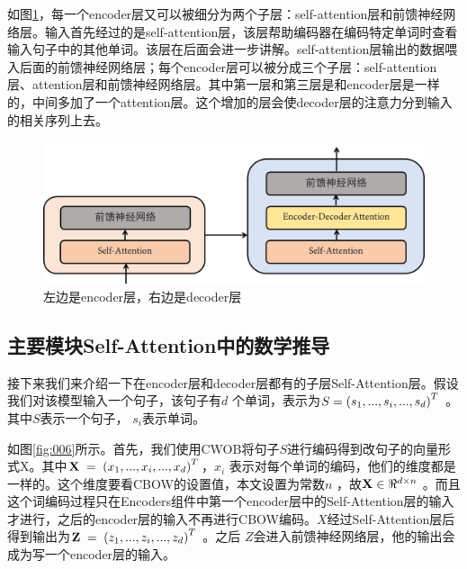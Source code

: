 \documentclass[]{article}
\begin{document}
如图\ref{fig:005}，每一个encoder层又可以被细分为两个子层：self-attention层和前馈神经网络层。输入首先经过的是self-attention层，该层帮助编码器在编码特定单词时查看输入句子中的其他单词。该层在后面会进一步讲解。self-attention层输出的数据喂入后面的前馈神经网络层；每个encoder层可以被分成三个子层：self-attention层、attention层和前馈神经网络层。其中第一层和第三层是和encoder层是一样的，中间多加了一个attention层。这个增加的层会使decoder层的注意力分到输入的相关序列上去。
\begin{figure}[htbp]
	\centering
	\includegraphics[width=0.6\linewidth]{figures/005}
	\caption{左边是encoder层，右边是decoder层}
	\label{fig:005}
\end{figure}

\subsection{主要模块Self-Attention中的数学推导}

接下来我们来介绍一下在encoder层和decoder层都有的子层Self-Attention层。假设我们对该模型输入一个句子，该句子有$ d $ 个单词，表示为$ S\;{\rm{ = }}\;{\left( {{s_1},...,{s_i},...,{s_d}} \right)^T} $ 。其中$ S $表示一个句子， $ s_i $表示单词。

如图\ref{fig:006}所示。首先，我们使用CWOB将句子$ S $进行编码得到改句子的向量形式X。其中$ {\bf{X}}\; = \;{\left( {{x_1},...,{x_i},...,{x_d}} \right)^T} $，$ x_i $ 表示对每个单词的编码，他们的维度都是一样的。这个维度要看CBOW的设置值，本文设置为常数$ n $ ，故$ {\bf{X}} \in {\Re ^{d \times n}} $ 。而且这个词编码过程只在Encoders组件中第一个encoder层中的Self-Attention层的输入才进行，之后的encoder层的输入不再进行CBOW编码。$ X $经过Self-Attention层后得到输出为$ {\bf{Z}}\; = \;{\left( {{z_1},...,{z_i},...,{z_d}} \right)^T} $ 。之后 $ Z $会进入前馈神经网络层，他的输出会成为写一个encoder层的输入。
\end{document}
